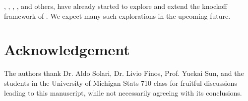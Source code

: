 \documentclass[article,lineno]{biometrika}
\begin{document}
	\cite{DaiknockofffilterFDR2016}, \cite{JansonFamilywiseerrorrate2016}, \cite{ChenAnalysisKnockoffFilter2017}, \cite{ChenPseudoKnockoffFilter2017}, and others, have already started to explore and extend the knockoff framework of \cite{BarberControllingfalsediscovery2015}.
	We expect many such explorations in the upcoming future.
	
	
	
	\section*{Acknowledgement}
	The authors thank  Dr. Aldo Solari, Dr. Livio Finos, Prof. Yuekai Sun, and the students in the University of Michigan Stats 710 class for fruitful discussions leading to this manuscript, while not necessarily agreeing with its conclusions.
	
	
	
	
	
	
	
\end{document}
